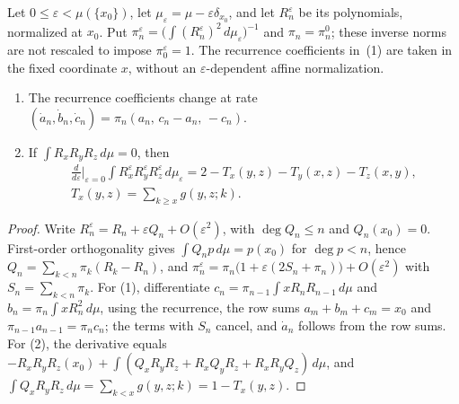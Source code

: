 \begin{lemma}\label{lem:topmass}
Let $0\leq\varepsilon<\mu(\{x_0\})$, let $\mu_\varepsilon=\mu-\varepsilon\delta_{x_0}$, and let $R_n^\varepsilon$ be its polynomials, normalized at $x_0$. Put $\pi_n^\varepsilon=\bigl(\int(R_n^\varepsilon)^2\,d\mu_\varepsilon\bigr)^{-1}$ and $\pi_n=\pi_n^0$; these inverse norms are not rescaled to impose $\pi_0^\varepsilon=1$. The recurrence coefficients in~(1) are taken in the fixed coordinate $x$, without an $\varepsilon$-dependent affine normalization.
\begin{enumerate}
\item The recurrence coefficients change at rate $(\dot a_n,\dot b_n,\dot c_n)=\pi_n(a_n,\,c_n-a_n,\,-c_n)$.
\item If $\int R_xR_yR_z\,d\mu=0$, then
\begin{gather*}
\frac{d}{d\varepsilon}\Big|_{\varepsilon=0}\int R^\varepsilon_xR^\varepsilon_yR^\varepsilon_z\,d\mu_\varepsilon=2-T_x(y,z)-T_y(x,z)-T_z(x,y),\\
T_x(y,z)=\sum_{k\geq x}g(y,z;k).
\end{gather*}
\end{enumerate}
\end{lemma}
\begin{proof}
Write $R_n^\varepsilon=R_n+\varepsilon Q_n+O(\varepsilon^2)$, with $\deg Q_n\leq n$ and $Q_n(x_0)=0$. First-order orthogonality gives $\int Q_np\,d\mu=p(x_0)$ for $\deg p<n$, hence $Q_n=\sum_{k<n}\pi_k(R_k-R_n)$, and $\pi_n^\varepsilon=\pi_n\bigl(1+\varepsilon(2S_n+\pi_n)\bigr)+O(\varepsilon^2)$ with $S_n=\sum_{k<n}\pi_k$. For (1), differentiate $c_n=\pi_{n-1}\int xR_nR_{n-1}\,d\mu$ and $b_n=\pi_n\int xR_n^2\,d\mu$, using the recurrence, the row sums $a_m+b_m+c_m=x_0$ and $\pi_{n-1}a_{n-1}=\pi_nc_n$; the terms with $S_n$ cancel, and $\dot a_n$ follows from the row sums. For (2), the derivative equals $-R_xR_yR_z(x_0)+\int(Q_xR_yR_z+R_xQ_yR_z+R_xR_yQ_z)\,d\mu$, and $\int Q_xR_yR_z\,d\mu=\sum_{k<x}g(y,z;k)=1-T_x(y,z)$.
\end{proof}

